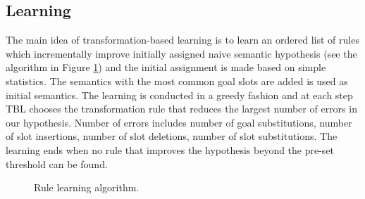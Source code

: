 \documentclass{article}
\begin{document}
\subsection{Learning} \label{sec:tbl:learning}
The main idea of transformation-based learning is to learn an ordered list of rules which incrementally improve initially assigned naive semantic hypothesis (see the algorithm in Figure \ref{alg:tbl:learning}) and the initial assignment is made based on simple statistics. The semantics with the most common goal slots are added is used as initial semantics. The learning is conducted in a greedy fashion and at each step TBL chooses the transformation rule that reduces the largest number of errors in our hypothesis. Number of errors includes number of goal substitutions, number of slot insertions, number of slot deletions, number of slot substitutions. The learning ends when no rule that improves the hypothesis beyond the pre-set threshold can be found.


\begin{figure}
\caption{Rule learning algorithm.}
\label{alg:tbl:learning}
\end{figure} 
\end{document}
